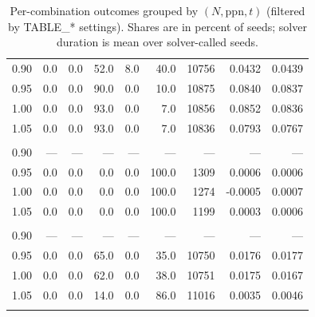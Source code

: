 \begin{table}[t]
\begin{tabular}{r r r r r r r r r}
\midrule
0.90 & 0.0 & 0.0 & 52.0 & 8.0 & 40.0 & 10756 & 0.0432 & 0.0439 \\
0.95 & 0.0 & 0.0 & 90.0 & 0.0 & 10.0 & 10875 & 0.0840 & 0.0837 \\
1.00 & 0.0 & 0.0 & 93.0 & 0.0 & 7.0 & 10856 & 0.0852 & 0.0836 \\
1.05 & 0.0 & 0.0 & 93.0 & 0.0 & 7.0 & 10836 & 0.0793 & 0.0767 \\
\addlinespace[0.35em]
\multicolumn{9}{l}{$N=32$, $\mathrm{ppn}=8$, $t=1\,\mathrm{s}$} \\
\midrule
0.90 & — & — & — & — & — & — & — & — \\
0.95 & 0.0 & 0.0 & 0.0 & 0.0 & 100.0 & 1309 & 0.0006 & 0.0006 \\
1.00 & 0.0 & 0.0 & 0.0 & 0.0 & 100.0 & 1274 & -0.0005 & 0.0007 \\
1.05 & 0.0 & 0.0 & 0.0 & 0.0 & 100.0 & 1199 & 0.0003 & 0.0006 \\
\addlinespace[0.35em]
\multicolumn{9}{l}{$N=32$, $\mathrm{ppn}=8$, $t=10\,\mathrm{s}$} \\
\midrule
0.90 & — & — & — & — & — & — & — & — \\
0.95 & 0.0 & 0.0 & 65.0 & 0.0 & 35.0 & 10750 & 0.0176 & 0.0177 \\
1.00 & 0.0 & 0.0 & 62.0 & 0.0 & 38.0 & 10751 & 0.0175 & 0.0167 \\
1.05 & 0.0 & 0.0 & 14.0 & 0.0 & 86.0 & 11016 & 0.0035 & 0.0046 \\
\addlinespace[0.35em]
\bottomrule
\end{tabular}
\caption{Per-combination outcomes grouped by $(N,\mathrm{ppn},t)$ (filtered by TABLE\_* settings). Shares are in percent of seeds; solver duration is mean over solver-called seeds.}
\label{tab:kwok-workload-once-kmax1}
\end{table}
